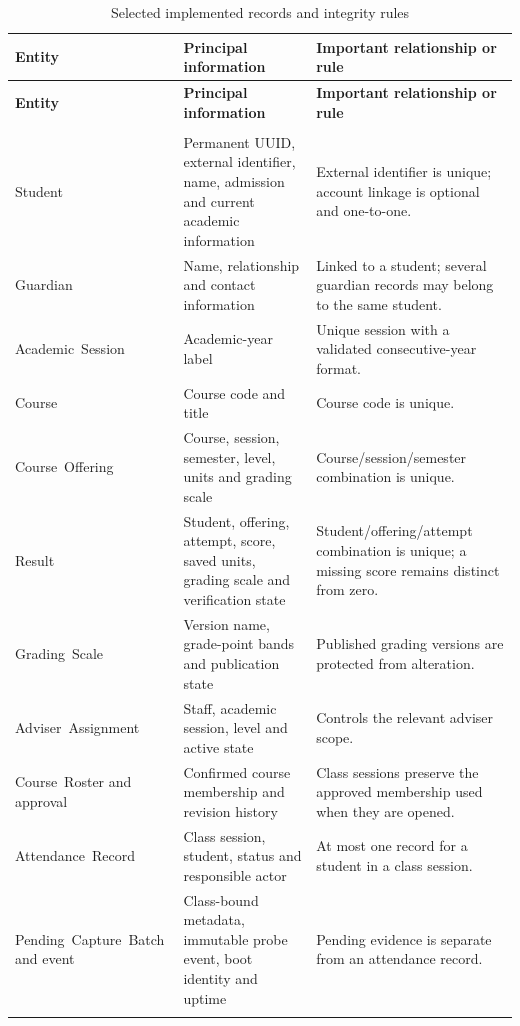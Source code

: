\begingroup
\singlespacing%
\setlength{\tabcolsep}{4pt}
\begin{longtable}{@{}>{\RaggedRight\arraybackslash}p{}>{\RaggedRight\arraybackslash}p{}>{\RaggedRight\arraybackslash}p{}@{}}
\caption{Selected implemented records and integrity rules}\label{tab:3-2}\\
\toprule
\textbf{Entity} & \textbf{Principal information} & \textbf{Important relationship or rule} \\
\midrule
\endfirsthead%
\toprule
\textbf{Entity} & \textbf{Principal information} & \textbf{Important relationship or rule} \\
\midrule
\endhead%
\midrule
\multicolumn{3}{r}{Continued on next page}\\
\endfoot%
\bottomrule
\endlastfoot%
Student & Permanent UUID, external identifier, name, admission and current academic information & External identifier is unique; account linkage is optional and one-to-one. \\ \addlinespace
Guardian & Name, relationship and contact information & Linked to a student; several guardian records may belong to the same student. \\ \addlinespace
Academic\allowbreak~Session & Academic-year label & Unique session with a validated consecutive-year format. \\ \addlinespace
Course & Course code and title & Course code is unique. \\ \addlinespace
Course\allowbreak~Offering & Course, session, semester, level, units and grading scale & Course/session/semester combination is unique. \\ \addlinespace
Result & Student, offering, attempt, score, saved units, grading scale and verification state & Student/offering/attempt combination is unique; a missing score remains distinct from zero. \\ \addlinespace
Grading\allowbreak~Scale & Version name, grade-point bands and publication state & Published grading versions are protected from alteration. \\ \addlinespace
Adviser\allowbreak~Assignment & Staff, academic session, level and active state & Controls the relevant adviser scope. \\ \addlinespace
Course\allowbreak~Roster and approval & Confirmed course membership and revision history & Class sessions preserve the approved membership used when they are opened. \\ \addlinespace
Attendance\allowbreak~Record & Class session, student, status and responsible actor & At most one record for a student in a class session. \\ \addlinespace
Pending\allowbreak~Capture\allowbreak~Batch and event & Class-bound metadata, immutable probe event, boot identity and uptime & Pending evidence is separate from an attendance record. \\ \addlinespace
\end{longtable}
\endgroup
